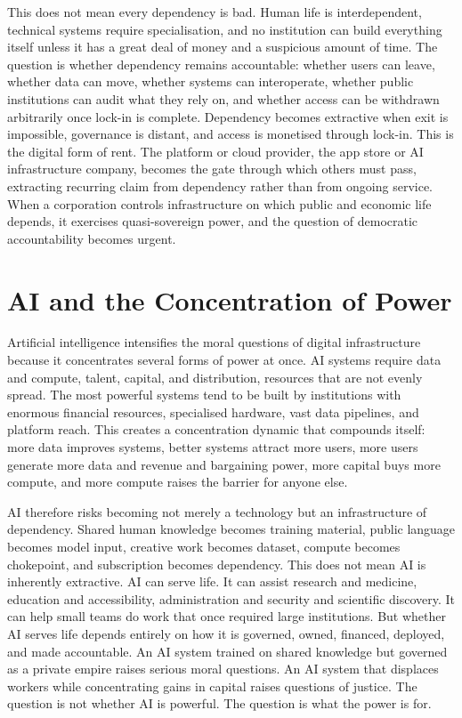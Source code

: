 \documentclass[11pt,a4paper,oneside]{book}
\begin{document}
This does not mean every dependency is bad. Human life is interdependent, technical systems require specialisation, and no institution can build everything itself unless it has a great deal of money and a suspicious amount of time. The question is whether dependency remains accountable: whether users can leave, whether data can move, whether systems can interoperate, whether public institutions can audit what they rely on, and whether access can be withdrawn arbitrarily once lock-in is complete. Dependency becomes extractive when exit is impossible, governance is distant, and access is monetised through lock-in. This is the digital form of rent. The platform or cloud provider, the app store or AI infrastructure company, becomes the gate through which others must pass, extracting recurring claim from dependency rather than from ongoing service. When a corporation controls infrastructure on which public and economic life depends, it exercises quasi-sovereign power, and the question of democratic accountability becomes urgent.

\section*{AI and the Concentration of Power}

Artificial intelligence intensifies the moral questions of digital infrastructure because it concentrates several forms of power at once. AI systems require data and compute, talent, capital, and distribution, resources that are not evenly spread. The most powerful systems tend to be built by institutions with enormous financial resources, specialised hardware, vast data pipelines, and platform reach. This creates a concentration dynamic that compounds itself: more data improves systems, better systems attract more users, more users generate more data and revenue and bargaining power, more capital buys more compute, and more compute raises the barrier for anyone else.

AI therefore risks becoming not merely a technology but an infrastructure of dependency. Shared human knowledge becomes training material, public language becomes model input, creative work becomes dataset, compute becomes chokepoint, and subscription becomes dependency. This does not mean AI is inherently extractive. AI can serve life. It can assist research and medicine, education and accessibility, administration and security and scientific discovery. It can help small teams do work that once required large institutions. But whether AI serves life depends entirely on how it is governed, owned, financed, deployed, and made accountable. An AI system trained on shared knowledge but governed as a private empire raises serious moral questions. An AI system that displaces workers while concentrating gains in capital raises questions of justice. The question is not whether AI is powerful. The question is what the power is for.
\end{document}
